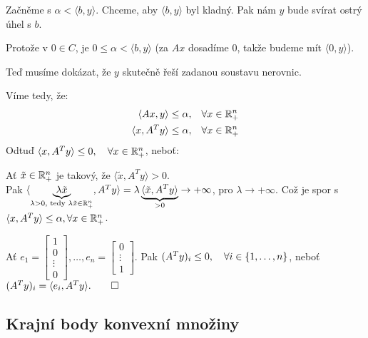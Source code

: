 Začněme s $\alpha < \langle b, y\rangle$. Chceme, aby $\langle b, y\rangle$ byl kladný. Pak nám $y$ bude svírat ostrý 
úhel s $b$. 

Protože v $0 \in C$, je $0 \leq \alpha < \langle b,y \rangle$ (za $Ax$ dosadíme $0$, takže budeme mít $\langle 0, y\rangle$).

Teď musíme dokázat, že $y$ skutečně řeší zadanou soustavu nerovnic.

Víme tedy, že:
\begin{align*}
    \langle Ax, y\rangle \leq \alpha,  &\quad \forall x \in \mathbb{R}^n_+ \\
    \langle x, A^T y\rangle \leq \alpha, &\quad \forall x \in \mathbb{R}^n_+
\end{align*}
Odtuď $\langle x, A^T y\rangle \leq 0, \quad \forall x \in \mathbb{R}^n_+$, neboť:

Ať $\tilde x \in \mathbb{R}^n_+$ je takový, že $\langle \tilde x, A^T y\rangle > 0$.\\
Pak $\langle \underbrace{\lambda \tilde x}_{\lambda > 0, \text{ tedy } \lambda \tilde x \in \mathbb{R}^n_+}, A^T y\rangle = 
\lambda \underbrace{\langle \tilde x, A^T y\rangle}_{> 0} \rightarrow + \infty$, pro $\lambda \rightarrow + \infty$.
Což je spor s $\langle x, A^T y\rangle \leq \alpha, \forall x \in \mathbb{R}^n_+$.

Ať $e_1=
\begin{bmatrix}
    1 \\
    0 \\
    \vdots \\
    0
\end{bmatrix}, \dots, e_n = 
\begin{bmatrix}
    0 \\
    \vdots \\
    1
\end{bmatrix}$. Pak $(A^T y)_i \leq 0, \quad \forall i \in \left\lbrace 1, \dots, n \right\rbrace$, neboť $(A^T y)_i = \langle e_i, A^T y\rangle. \qed$

\subsection{Krajní body konvexní množiny}

